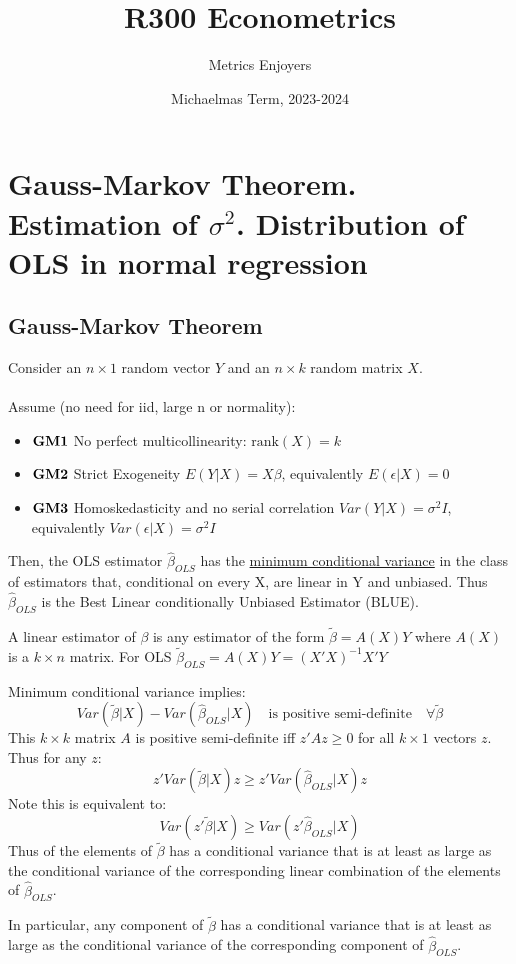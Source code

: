 \documentclass[DIV=14,titlepage=false]{scrreprt}
\title{%
R300 Econometrics}
\author{Metrics Enjoyers}
\date{Michaelmas Term, 2023-2024}
\begin{document}
\chapter{Gauss-Markov Theorem. Estimation of \(\sigma^2\). Distribution of OLS in normal regression}

\section{Gauss-Markov Theorem}
\begin{theorem}Consider an \(n\times1\) random vector \(Y\) and an \(n\times k\) random matrix \(X\).
   \\  \\ Assume (no need for iid, large n or normality): 
\begin{itemize}
    \item \(\bold{GM1}\) No perfect multicollinearity: \(\text{rank}(X) = k\)
    \item \(\bold{GM2}\) Strict Exogeneity \(E(Y|X)=X\beta\), equivalently \(E(\epsilon|X)=0\)
    \item \(\bold{GM3}\) Homoskedasticity and no serial correlation \(Var(Y|X)=\sigma^2 I\), 
    \\ equivalently \(Var(\epsilon|X)=\sigma^2 I\)
\end{itemize}
    Then, the OLS estimator \(\hat{\beta}_{OLS}\) has the \underline{minimum conditional variance} in the class of estimators that, conditional on every X, are linear in Y and unbiased.
    Thus \(\hat{\beta}_{OLS}\) is the Best Linear conditionally Unbiased Estimator (BLUE).
\end{theorem}

A linear estimator of \(\beta\) is any estimator of the form \(\tilde{\beta}=A(X)Y\) where \(A(X)\) is a \(k\times n\) matrix.
For OLS \(\tilde{\beta}_{OLS}=A(X)Y=(X'X)^{-1}X'Y\)

\begin{definition}
    Minimum conditional variance implies:
    \[Var(\tilde{\beta}|X) - Var(\hat{\beta}_{OLS}|X) \quad \text{is positive semi-definite} \quad \forall \tilde{\beta}\]
    This \(k\times k\) matrix \(A\) is positive semi-definite iff \(z'Az\geq0\) for all \(k\times1\) vectors \(z\).
    Thus for any \(z\): \[z'Var(\tilde{\beta}|X)z\geq z'Var(\hat{\beta}_{OLS}|X)z\]
    Note this is equivalent to: \[Var(z'\tilde{\beta}|X) \geq Var(z'\hat{\beta}_{OLS}|X)\]
    Thus \underline{} of the elements of \(\tilde{\beta}\) has a conditional variance that is at least as large as the conditional variance of the corresponding linear combination of the elements of \(\hat{\beta}_{OLS}\). 
    
    In particular, any component of \(\tilde{\beta}\) has a conditional variance that is at least as large as the conditional variance of the corresponding component of \(\hat{\beta}_{OLS}\).
\end{definition}
\end{document}
